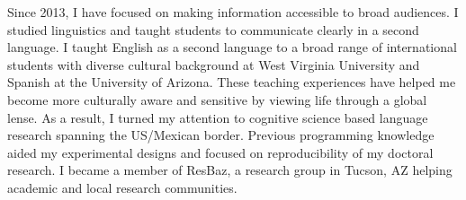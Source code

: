 \documentclass[12pt, letterpaper]{awesome-cv} %
\begin{document}
\begin{cvletter}
Since 2013, I have focused on making information accessible to broad audiences. I studied linguistics and taught students to communicate clearly in a second language. I taught English as a second language to a broad range of international students with diverse cultural background at West Virginia University and Spanish at the University of Arizona. These teaching experiences have helped me become more culturally aware and sensitive by viewing life through a global lense. %
As a result, I turned my attention to cognitive science based language research spanning the US/Mexican border. Previous programming knowledge aided my experimental designs and focused on reproducibility of my doctoral research. %
I became a member of ResBaz, a research group in Tucson, AZ helping academic and local research communities. %

\end{cvletter}
\end{document}
